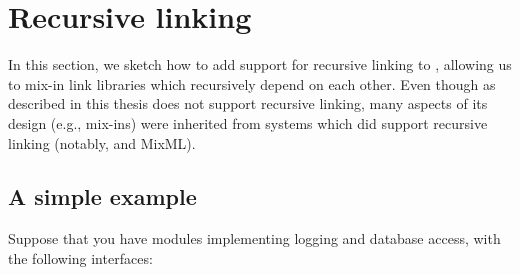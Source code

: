 
\chapter{Recursive linking}
\label{sec:recursive-linking}

In this section, we sketch how to add support for recursive linking to
\Backpack{}, allowing us to mix-in link libraries which recursively
depend on each other.  Even though \Backpack{} as described in this
thesis does not support recursive linking, many aspects of its design
(e.g., mix-ins) were inherited from systems which did support recursive
linking (notably, \OldBackpack{} and MixML).


\section{A simple example}

Suppose that you have modules implementing logging and database access,
with the following interfaces:

